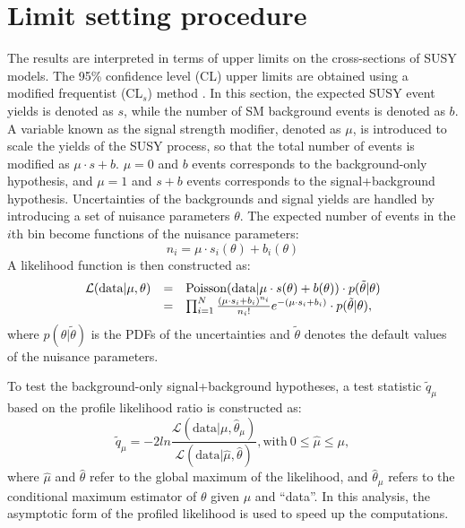 \documentclass[thesis.tex]{subfiles}
\renewcommand\_{\textunderscore\allowbreak}
\begin{document}
\section{Limit setting procedure}
The results are interpreted in terms of upper limits on the cross-sections of SUSY models. 
The 95\% confidence level (CL) upper limits are obtained using a modified frequentist (CL$_s$) method \cite{Junk:1999kv,Read:2002hq,CMS-NOTE-2011-005}.
In this section, the expected SUSY event yields is denoted as $s$, while the number of SM background events is denoted as $b$. 
A variable known as the signal strength modifier, denoted as $\mu$, is introduced to scale the yields of the SUSY process, so that the total number of events is modified as $\mu \cdot s +b$. 
$\mu = 0$ and $b$ events corresponds to the background-only hypothesis, and $\mu = 1$ and $s+b$ events corresponds to the signal+background hypothesis.
Uncertainties of the backgrounds and signal yields are handled by introducing a set of nuisance parameters $\theta$.
The expected number of events in the $i$th bin become functions of the nuisance parameters: 
\begin{equation}
	n_i = \mu \cdot s_i(\theta) + b_i(\theta)
\end{equation}
A likelihood function is then constructed as:
\begin{equation}
	\begin{array}{c c l}
	\mathcal{L}( \text{data}|\mu, \theta) & = & \text{Poisson}(\text{data}|\mu \cdot s(\theta) + b(\theta)) \cdot p(\tilde{\theta} | \theta) \\
							       & = & \prod_{i=1}^N \frac{(\mu \cdot s_i + b_i)^{n_i}}{n_i !} e^{- (\mu \cdot s_i + b_i) } \cdot p(\tilde{\theta} | \theta),
	\end{array}
\end{equation}
where $p(\theta | \tilde{\theta})$ is the PDFs of the uncertainties and $\tilde{\theta}$ denotes the default values of the nuisance parameters. 

To test the background-only signal+background hypotheses, a test statistic $\tilde{q}_\mu$ based on the profile likelihood ratio is constructed as:
\begin{equation}
	\tilde{q}_\mu = -2 ln \frac{\mathcal{L}( \text{data}|\mu, \hat{\theta}_\mu)}{\mathcal{L}( \text{data}|\hat{\mu}, \hat{\theta})}, \text{with}\  0 \le \hat{\mu} \le \mu, 
\end{equation}
where $\hat{\mu}$ and $\hat{\theta}$ refer to the global maximum of the likelihood, and $\hat{\theta}_\mu$ refers to the conditional maximum estimator of $\theta$ given $\mu$ and ``data''. 
In this analysis, the asymptotic form of the profiled likelihood \cite{Cowan2011} is used to speed up the computations. 
\end{document}
